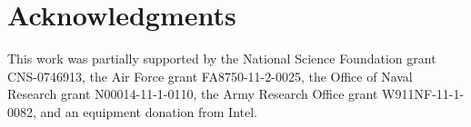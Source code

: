 \vspace{-0.1in}
\section*{Acknowledgments}
\label{sec:ack}

This work was partially supported by the National Science Foundation
grant CNS-0746913,
the Air Force grant FA8750-11-2-0025,
the Office of Naval Research grant N00014-11-1-0110,
the Army Research Office grant W911NF-11-1-0082,
and an equipment donation from Intel.

